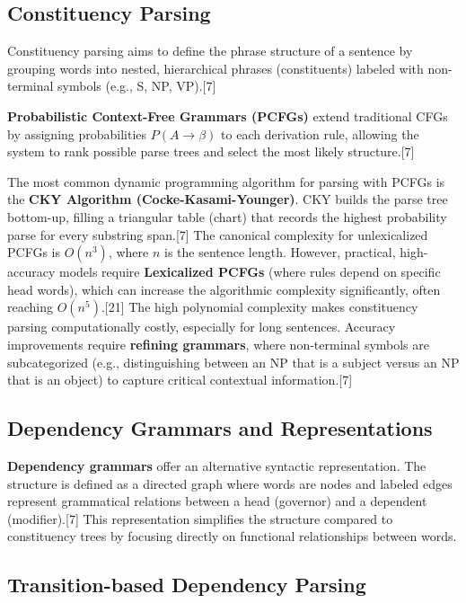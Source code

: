 \documentclass{article}
\begin{document}
\subsection{Constituency Parsing}

Constituency parsing aims to define the phrase structure of a sentence by grouping words into nested, hierarchical phrases (constituents) labeled with non-terminal symbols (e.g., S, NP, VP).[7]

\textbf{Probabilistic Context-Free Grammars (PCFGs)} extend traditional CFGs by assigning probabilities $P(A \rightarrow \beta)$ to each derivation rule, allowing the system to rank possible parse trees and select the most likely structure.[7]

The most common dynamic programming algorithm for parsing with PCFGs is the \textbf{CKY Algorithm (Cocke-Kasami-Younger)}. CKY builds the parse tree bottom-up, filling a triangular table (chart) that records the highest probability parse for every substring span.[7] The canonical complexity for unlexicalized PCFGs is $O(n^3)$, where $n$ is the sentence length. However, practical, high-accuracy models require \textbf{Lexicalized PCFGs} (where rules depend on specific head words), which can increase the algorithmic complexity significantly, often reaching $O(n^5)$.[21] The high polynomial complexity makes constituency parsing computationally costly, especially for long sentences. Accuracy improvements require \textbf{refining grammars}, where non-terminal symbols are subcategorized (e.g., distinguishing between an NP that is a subject versus an NP that is an object) to capture critical contextual information.[7]

\subsection{Dependency Grammars and Representations}

\textbf{Dependency grammars} offer an alternative syntactic representation. The structure is defined as a directed graph where words are nodes and labeled edges represent grammatical relations between a head (governor) and a dependent (modifier).[7] This representation simplifies the structure compared to constituency trees by focusing directly on functional relationships between words.

\subsection{Transition-based Dependency Parsing}
\end{document}
